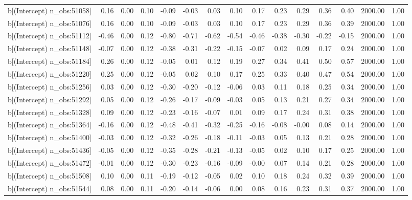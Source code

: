 \begin{table}[ht]
\begin{tabular}{rrrrrrrrrrrrrrr}
  b[(Intercept) n\_obs:51058] & 0.16 & 0.00 & 0.10 & -0.09 & -0.03 & 0.03 & 0.10 & 0.17 & 0.23 & 0.29 & 0.36 & 0.40 & 2000.00 & 1.00 \\ 
  b[(Intercept) n\_obs:51076] & 0.16 & 0.00 & 0.10 & -0.09 & -0.03 & 0.03 & 0.10 & 0.17 & 0.23 & 0.29 & 0.36 & 0.39 & 2000.00 & 1.00 \\ 
  b[(Intercept) n\_obs:51112] & -0.46 & 0.00 & 0.12 & -0.80 & -0.71 & -0.62 & -0.54 & -0.46 & -0.38 & -0.30 & -0.22 & -0.15 & 2000.00 & 1.00 \\ 
  b[(Intercept) n\_obs:51148] & -0.07 & 0.00 & 0.12 & -0.38 & -0.31 & -0.22 & -0.15 & -0.07 & 0.02 & 0.09 & 0.17 & 0.24 & 2000.00 & 1.00 \\ 
  b[(Intercept) n\_obs:51184] & 0.26 & 0.00 & 0.12 & -0.05 & 0.01 & 0.12 & 0.19 & 0.27 & 0.34 & 0.41 & 0.50 & 0.57 & 2000.00 & 1.00 \\ 
  b[(Intercept) n\_obs:51220] & 0.25 & 0.00 & 0.12 & -0.05 & 0.02 & 0.10 & 0.17 & 0.25 & 0.33 & 0.40 & 0.47 & 0.54 & 2000.00 & 1.00 \\ 
  b[(Intercept) n\_obs:51256] & 0.03 & 0.00 & 0.12 & -0.30 & -0.20 & -0.12 & -0.06 & 0.03 & 0.11 & 0.18 & 0.25 & 0.34 & 2000.00 & 1.00 \\ 
  b[(Intercept) n\_obs:51292] & 0.05 & 0.00 & 0.12 & -0.26 & -0.17 & -0.09 & -0.03 & 0.05 & 0.13 & 0.21 & 0.27 & 0.34 & 2000.00 & 1.00 \\ 
  b[(Intercept) n\_obs:51328] & 0.09 & 0.00 & 0.12 & -0.23 & -0.16 & -0.07 & 0.01 & 0.09 & 0.17 & 0.24 & 0.31 & 0.38 & 2000.00 & 1.00 \\ 
  b[(Intercept) n\_obs:51364] & -0.16 & 0.00 & 0.12 & -0.48 & -0.41 & -0.32 & -0.25 & -0.16 & -0.08 & -0.00 & 0.08 & 0.14 & 2000.00 & 1.00 \\ 
  b[(Intercept) n\_obs:51400] & -0.03 & 0.00 & 0.12 & -0.32 & -0.26 & -0.18 & -0.11 & -0.03 & 0.05 & 0.13 & 0.21 & 0.28 & 2000.00 & 1.00 \\ 
  b[(Intercept) n\_obs:51436] & -0.05 & 0.00 & 0.12 & -0.35 & -0.28 & -0.21 & -0.13 & -0.05 & 0.02 & 0.10 & 0.17 & 0.25 & 2000.00 & 1.00 \\ 
  b[(Intercept) n\_obs:51472] & -0.01 & 0.00 & 0.12 & -0.30 & -0.23 & -0.16 & -0.09 & -0.00 & 0.07 & 0.14 & 0.21 & 0.28 & 2000.00 & 1.00 \\ 
  b[(Intercept) n\_obs:51508] & 0.10 & 0.00 & 0.11 & -0.19 & -0.12 & -0.05 & 0.02 & 0.10 & 0.18 & 0.24 & 0.32 & 0.39 & 2000.00 & 1.00 \\ 
  b[(Intercept) n\_obs:51544] & 0.08 & 0.00 & 0.11 & -0.20 & -0.14 & -0.06 & 0.00 & 0.08 & 0.16 & 0.23 & 0.31 & 0.37 & 2000.00 & 1.00 \\ 

\end{tabular}
\end{table}

